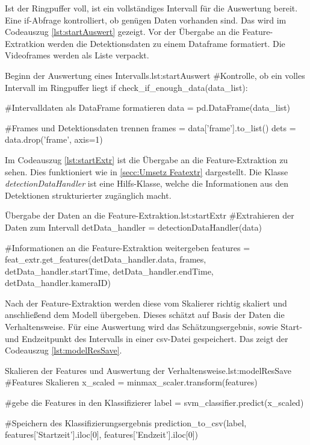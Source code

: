 Ist der Ringpuffer voll, ist ein vollständiges Intervall für die Auswertung bereit. Eine if-Abfrage kontrolliert, ob genügen Daten vorhanden sind. Das wird im Codeauszug \ref{lst:startAuswert} gezeigt. Vor der Übergabe an die Feature-Extratkion werden die Detektionsdaten zu einem Dataframe formatiert. Die Videoframes werden als Liste verpackt. 

\begin{pythoncode}{Beginn der Auswertung eines Intervalls.}{lst:startAuswert}
#Kontrolle, ob ein volles Intervall im Ringpuffer liegt
if check_if_enough_data(data_list):

    #Intervalldaten als DataFrame formatieren 
    data = pd.DataFrame(data_list)

    #Frames und Detektionsdaten trennen 
    frames = data['frame'].to_list()
    dets = data.drop('frame', axis=1)
\end{pythoncode}

Im Codeauszug \ref{lst:startExtr} ist die Übergabe an die Feature-Extraktion zu sehen. Dies funktioniert wie in \ref{secc:Umsetz Featextr} dargestellt. Die Klasse \textit{detectionDataHandler} ist eine Hilfs-Klasse, welche die Informationen aus den Detektionen strukturierter zugänglich macht. 

\begin{pythoncode}{Übergabe der Daten an die Feature-Extraktion.}{lst:startExtr}
#Extrahieren der Daten zum Intervall 
detData_handler = detectionDataHandler(data)

#Informationen an die Feature-Extraktion weitergeben
features = feat_extr.get_features(detData_handler.data, 
                                frames, 
                                detData_handler.startTime, 
                                detData_handler.endTime, 
                                detData_handler.kameraID)
\end{pythoncode}

Nach der Feature-Extraktion werden diese vom Skalierer richtig skaliert und anschließend dem Modell übergeben. Dieses schätzt auf Basis der Daten die Verhaltensweise. Für eine Auswertung wird das Schätzungsergebnis, sowie Start- und Endzeitpunkt des Intervalls in einer csv-Datei gespeichert. Das zeigt der Codeauszug \ref{lst:modelResSave}.

\begin{pythoncode}{Skalieren der Features und Auswertung der Verhaltensweise.}{lst:modelResSave}
#Features Skalieren
x_scaled = minmax_scaler.transform(features) 

#gebe die Features in den Klassifizierer
label = svm_classifier.predict(x_scaled)

#Speichern des Klassifizierungsergebnis
prediction_to_csv(label, 
                  features['Startzeit'].iloc[0], 
                  features['Endzeit'].iloc[0])
\end{pythoncode}


                